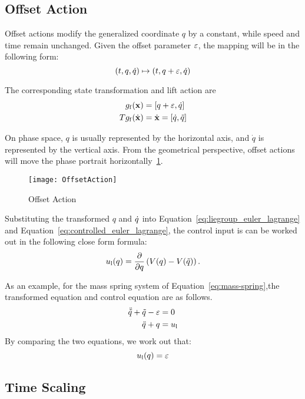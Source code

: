 \subsection*{ Offset Action}
Offset actions  modify the generalized coordinate $q$ by a constant, while speed and time remain unchanged.
Given the offset parameter $\varepsilon$, the mapping will be in the following form:
\[
(t,q,\dot{q}) \mapsto (t,q+\varepsilon,\dot{q})
\]

The corresponding state transformation and lift action are
\begin{align}
g_{\mathrm{f}}(\mathbf{x}) &= [q+\varepsilon,\dot{q}] \\
Tg_{\mathrm{f}}(\dot{\mathbf{x}})&=\dot{\mathbf{x}}=[\dot{q},\ddot{q}]
\end{align}


On phase space,  $q$ is usually represented by the horizontal axis, and $\dot{q}$ is represented by the vertical axis.
From the geometrical perspective, offset actions will move the phase portrait horizontally~\ref{fig:goff}.

\begin{figure}[!htbp]
  \begin{center}
      \texttt{[image: OffsetAction]}
    \caption{Offset Action}
    \label{fig:goff}
\end{center}
\end{figure}

Substituting the transformed $q$ and $\dot{q}$ into Equation~\ref{eq:liegroup_euler_lagrange} and Equation~\ref{eq:controlled_euler_lagrange},
the control input is can be worked out in the following close form formula:
\begin{equation}
u_{\mathrm{l}}(q) = \frac{\partial}{\partial q} \left(V(q)-V(\tilde{q}) \right).
\end{equation}

As an example, for the mass spring system of Equation~\ref{eq:mass-spring},the transformed equation  and control equation are as follows.
\begin{align}
\ddot{\tilde{q}}+\tilde{q}-\varepsilon&=0 \nonumber \\
\ddot{q}+q&=u_{\mathrm{l}} \nonumber
\end{align}
By comparing the two equations, we work out that:
\[
u_{\mathrm{l}}(q)=\varepsilon
\]




\subsection*{Time Scaling}

